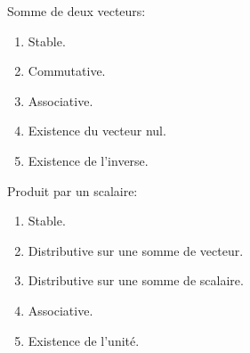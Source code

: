 \documentclass[a4paper]{article}
\begin{document}
{    \begin{center}
        \begin{minipage}[t]{0.45\textwidth}\vspace{0pt}
            Somme de deux vecteurs:
            \begin{enumerate}
                \item Stable.
                \item Commutative.
                \item Associative.
                \item Existence du vecteur nul.
                \item Existence de l'inverse.
            \end{enumerate}

        \end{minipage}
        \hfill
        \begin{minipage}[t]{0.45\textwidth}\vspace{0pt}
            Produit par un scalaire:
            \begin{enumerate}
                \item Stable.
                \item Distributive sur une somme de vecteur.
                \item Distributive sur une somme de scalaire.
                \item Associative.
                \item Existence de l'unité.
            \end{enumerate}

        \end{minipage}
    \end{center}
}

\end{document}
